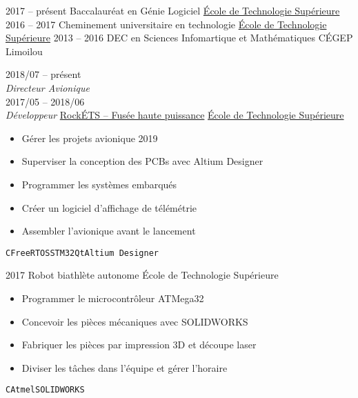 \documentclass[9pt]{developercv} %
\begin{document}
\begin{minipage}[t]{0.8\textwidth}

\begin{entrylist}
	\entry
		{2017 -- présent}
		{Baccalauréat en Génie Logiciel}
		{\href{https://etsmtl.ca}{École de Technologie Supérieure}}
		{\vspace{-14pt}}
	\entry
		{2016 -- 2017}
		{Cheminement universitaire en technologie}
		{\href{https://etsmtl.ca}{École de Technologie Supérieure}}
		{\vspace{-14pt}}
	\entry
		{2013 -- 2016}
		{DEC en Sciences Infomartique et Mathématiques}
		{CÉGEP Limoilou}
		{\vspace{-14pt}}
\end{entrylist}



\begin{entrylist}
	\entry
		{2018/07 -- présent\\{\small\emph{Directeur Avionique}}\\2017/05 -- 2018/06\\{\small\emph{Développeur}}}
		{\href{https://clubrockets.ca/}{RockÉTS -- Fusée haute puissance}}
		{\href{https://clubrockets.ca/}{École de Technologie Supérieure}}
		{
			\vspace{-14pt}
			\begin{itemize}
				\renewcommand{\labelitemi}{\raisebox{.45ex}{\rule{.6ex}{.6ex}}}
				\setlength\itemsep{-1pt}
				\item Gérer les projets avionique 2019
				\item Superviser la conception des PCBs avec Altium Designer
				\item Programmer les systèmes embarqués
				\item Créer un logiciel d'affichage de télémétrie
				\item Assembler l'avionique avant le lancement
			\end{itemize}
			\vspace{-4pt}
			\texttt{C}\slashsep\texttt{FreeRTOS}\slashsep\texttt{STM32}\slashsep\texttt{Qt}\slashsep\texttt{Altium Designer}
		}
	\entry
		{2017}
		{Robot biathlète autonome}
		{École de Technologie Supérieure}
		{
			\vspace{-14pt}
			\begin{itemize}
				\renewcommand{\labelitemi}{\raisebox{.45ex}{\rule{.6ex}{.6ex}}}
				\setlength\itemsep{-1pt}
				\item Programmer le microcontrôleur ATMega32
				\item Concevoir les pièces mécaniques avec SOLIDWORKS
				\item Fabriquer les pièces par impression 3D et découpe laser
				\item Diviser les tâches dans l'équipe et gérer l'horaire
			\end{itemize}
			\vspace{-4pt}
			\texttt{C}\slashsep\texttt{Atmel}\slashsep\texttt{SOLIDWORKS}
		}
\end{entrylist}


\end{minipage}
\end{document}
